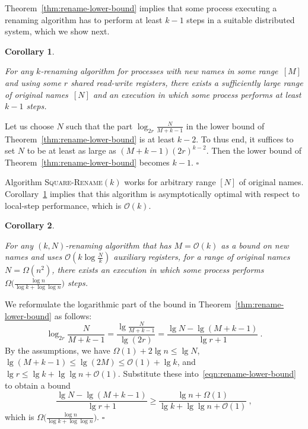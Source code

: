 \documentclass[11pt]{article}
\newcommand{\cO}{\mathcal{O}}
\newcommand{\qed}{\hfill $\square$ \smallbreak}
\newenvironment{proof}{\noindent{\bf Proof:}}{\qed}
\newtheorem{corollary}{Corollary}
\begin{document}
Theorem~\ref{thm:rename-lower-bound} implies that some process executing a renaming algorithm has to perform at least $k-1$ steps in a suitable distributed system, which we show next.



\begin{corollary}
\label{cor:lower-bound-k-steps}

For any $k$-renaming algorithm for processes with new names in some range~$[M]$ and using some $r$ shared read-write registers, there exists a sufficiently large range of original names~$[N]$ and an execution in which some process performs at least $k-1$ steps.
\end{corollary}

\begin{proof}
Let us choose $N$ such that the part $\log_{2r} \frac{N}{M+k-1}$ in the lower bound of Theorem~\ref{thm:rename-lower-bound} is at least $k-2$.
To thus end, it suffices to set $N$ to be at least as large as $(M+k-1)(2r)^{k-2}$.
Then the lower bound of Theorem~\ref{thm:rename-lower-bound} becomes $k-1$.
\end{proof}

Algorithm \textsc{Square-Rename}$(k)$ works for arbitrary range $[N]$ of  original names.
Corollary~\ref{cor:lower-bound-k-steps} implies that this algorithm is asymptotically optimal with respect to local-step performance, which is $\cO(k)$.



\begin{corollary}
\label{cor:lower-bound-k-N-renaming}

For any $(k,N)$-renaming algorithm that has $M = \cO( k)$ as a bound on new names and uses $\cO(k\log\frac{N}{k})$ auxiliary registers, for a range of original names $N=\Omega(n^2)$, there exists an execution in which some process performs $\Omega\bigl(\frac{\log n}{\log k +\log\log n}\bigr)$ steps.
\end{corollary}

\begin{proof}
We reformulate the logarithmic part of the bound in Theorem~\ref{thm:rename-lower-bound} as follows:
\begin{equation}
\label{eqn:rename-lower-bound}
\log_{2r} \frac{N}{M+k-1} = \frac{\lg \frac{N}{M+k-1}}{\lg (2r)} = \frac{\lg N-\lg (M +k-1)}{\lg r + 1}
\ .
\end{equation}
By the assumptions, we have $\Omega(1) + 2\lg n \le \lg N$, $\lg (M+k-1) \le \lg (2M) \le \cO(1) + \lg k$,  and $\lg  r \le  \lg k + \lg\lg n +\cO(1)$.
Substitute these into~\eqref{eqn:rename-lower-bound} to obtain a bound
\[
\frac{\lg N-\lg (M +k-1)}{\lg r + 1} \ge\frac{\lg n +\Omega(1)}{\lg k+ \lg\lg n +\cO(1)}
\ ,
\]
which is $\Omega\bigl(\frac{\log n}{\log k+\log\log n}\bigr)$.
\end{proof}
\end{document}
